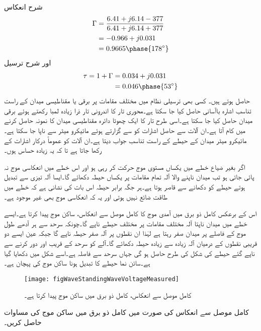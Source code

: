 شرح انعکاس
\begin{align*}
\Gamma&=\frac{6.41+j6.14-377}{6.41+j6.14+377}\\
&=-0.966+j0.031\\
&=0.9665\phase{178^{\circ}}
\end{align*}
اور شرح ترسیل
\begin{align*}
\tau=1+\Gamma&=0.034+j0.031\\
&=0.046\phase{53^{\circ}}
\end{align*}
حاصل ہوتے ہیں۔
کسی بھی ترسیلی نظام میں مختلف مقامات پر برقی یا مقناطیسی میدان کے راست تناسب اشارہ  باآسانی حاصل کیا جا سکتا ہے۔محوری تار کا اندرونی تار ذرا زیادہ لمبا رکھتے ہوئے برقی میدان حاصل کیا جا سکتا ہے۔اسی  طرح تار کا ایک چھوٹا دائرہ مقناطیسی میدان کا نمونہ حاصل کرنے میں کام آتا ہے۔ان آلات سے حاصل اشارات کو  سے گزارتے ہوئے مائیکرو میٹر سے ناپا جا سکتا ہے۔مائیکرو میٹر میدان کے حیطے کے راست تناسب جواب دیتا ہے۔ان آلات کو عموماً درکار اشارات کے  رکھا جاتا ہے تا کہ یہ زیادہ حساس ہوں۔

اگر بغیر ضیاع خطے میں یکساں مستوی موج حرکت کر رہی ہو اور اس خطے میں انعکاسی موج نہ پائی جاتی ہو تب میدان ناپنے والا آلہ تمام مقامات پر یکساں حیطہ دکھائے گا۔ایسا آلہ تیزی سے تبدیل ہوتے حیطے کو دکھانے سے قاصر ہوتا ہے۔ہر جگہ برابر حیطہ اس بات کی نشانی ہے کہ خطے میں طاقت ضائع نہیں ہوتی اور یہ کہ انعکاسی موج بھی غیر موجود ہے۔

اس کے برعکس کامل ذو برق میں آمدی موج کا کامل موصل سے انعکاس، ساکن موج پیدا کرتا ہے۔ایسے خطے میں میدان ناپتا آلہ مختلف مقامات پر مختلف حیطے ناپے گا۔چونکہ سرحد سے ہر آدھے طول موج کے فاصلے پر میدان صفر رہتا ہے لہٰذا ان نقطوں پر آلہ صفر حیطہ ناپے گا جبکہ عین ایسے دو قریبی نقطوں کے درمیان آلہ زیادہ سے زیادہ حیطہ دکھائے گا۔آلے کو سرحد کے قریب اور دور کرنے سے ناپے گئے حیطے کی شکل  کی طرح حاصل ہو گی جہاں سرحد سے فاصلہ  ہے۔اسے شکل  میں دکھایا گیا ہے۔سائن نما حیطے کا تبدیل ہونا ساکن موج کی پہچان ہے۔

\begin{figure}
\centering
\texttt{[image: figWaveStandingWaveVoltageMeasured]}
\caption{کامل موصل سے انعکاس، کامل ذو برق میں ساکن موج پیدا کرتا ہے۔}
\label{شکل_موج_ساکن_موج_شکل}
\end{figure}

کامل موصل سے انعکاس کی صورت میں کامل ذو برق میں ساکن موج کی مساوات حاصل کریں۔

